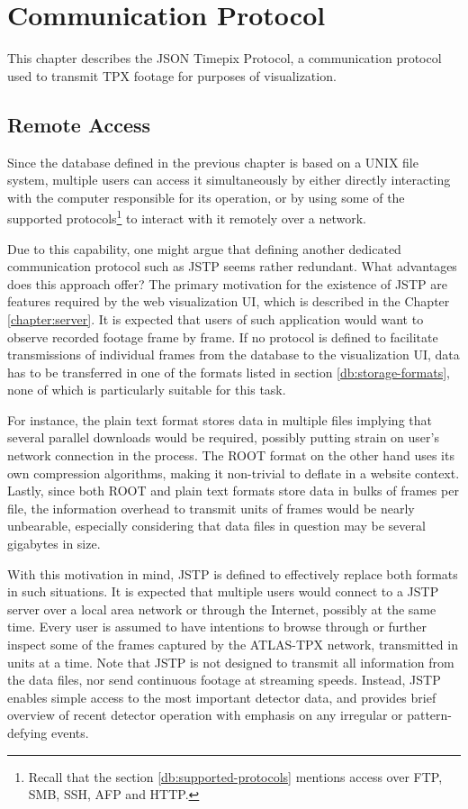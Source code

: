 \chapter{Communication Protocol}
\label{protocol:introduction}
This chapter describes the JSON Timepix Protocol, a communication protocol used to transmit TPX footage for purposes of visualization.

\section{Remote Access}
Since the database defined in the previous chapter is based on a UNIX file system, multiple users can access it simultaneously by either directly interacting with the computer responsible for its operation, or by using some of the supported protocols\footnote{Recall that the section \ref{db:supported-protocols} mentions access over FTP, SMB, SSH, AFP and HTTP.} to interact with it remotely over a network.

Due to this capability, one might argue that defining another dedicated communication protocol such as JSTP seems rather redundant. What advantages does this approach offer? The primary motivation for the existence of JSTP are features required by the web visualization UI, which is described in the Chapter \ref{chapter:server}. It is expected that users of such application would want to observe recorded footage frame by frame. If no protocol is defined to facilitate transmissions of individual frames from the database to the visualization UI, data has to be transferred in one of the formats listed in section \ref{db:storage-formats}, none of which is particularly suitable for this task.

For instance, the plain text format stores data in multiple files implying that several parallel downloads would be required, possibly putting strain on user's network connection in the process. The ROOT format on the other hand uses its own compression algorithms, making it non-trivial to deflate in a website context. Lastly, since both ROOT and plain text formats store data in bulks of frames per file, the information overhead to transmit units of frames would be nearly unbearable, especially considering that data files in question may be several gigabytes in size.

With this motivation in mind, JSTP is defined to effectively replace both formats in such situations. It is expected that multiple users would connect to a JSTP server over a local area network or through the Internet, possibly at the same time. Every user is assumed to have intentions to browse through or further inspect some of the frames captured by the ATLAS-TPX network, transmitted in units at a time. Note that JSTP is not designed to transmit all information from the data files, nor send continuous footage at streaming speeds. Instead, JSTP enables simple access to the most important detector data, and provides brief overview of recent detector operation with emphasis on any irregular or pattern-defying events.

